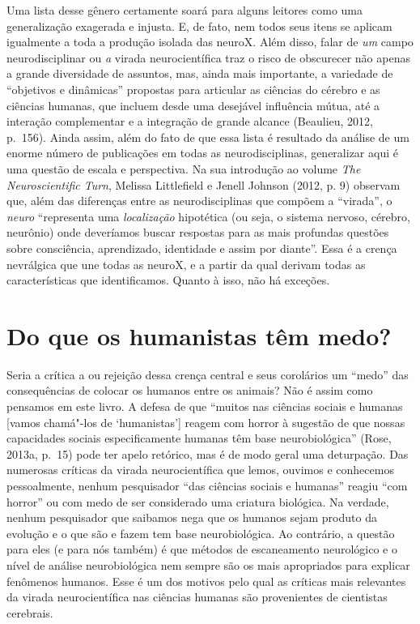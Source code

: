Uma lista desse gênero certamente soará para alguns leitores como uma
generalização exagerada e injusta. E, de fato, nem todos seus itens se
aplicam igualmente a toda a produção isolada das neuroX. Além disso,
falar de \emph{um} campo neurodisciplinar ou \emph{a} virada
neurocientífica traz o risco de obscurecer não apenas a grande
diversidade de assuntos, mas, ainda mais importante, a variedade de
``objetivos e dinâmicas'' propostas para articular as ciências do
cérebro e as ciências humanas, que incluem desde uma desejável
influência mútua, até a interação complementar e a integração de grande
alcance (Beaulieu, 2012, p.~156). Ainda assim, além do fato de que essa
lista é resultado da análise de um enorme número de publicações em todas
as neurodisciplinas, generalizar aqui é uma questão de escala e
perspectiva. Na sua introdução ao volume \emph{The Neuroscientific
Turn}, Melissa Littlefield e Jenell Johnson (2012, p. 9) observam que,
além das diferenças entre as neurodisciplinas que compõem a ``virada'',
o \emph{neuro} ``representa uma \emph{localização} hipotética (ou seja,
o sistema nervoso, cérebro, neurônio) onde deveríamos buscar respostas
para as mais profundas questões sobre consciência, aprendizado,
identidade e assim por diante''. Essa é a crença nevrálgica que une
todas as neuroX, e a partir da qual derivam todas as características que
identificamos. Quanto à isso, não há exceções.

\chapter{Do que os humanistas têm medo?}

Seria a crítica a ou rejeição dessa crença central e seus corolários um
``medo'' das consequências de colocar os humanos entre os animais? Não é
assim como pensamos em este livro. A defesa de que ``muitos nas ciências
sociais e humanas {[}vamos chamá"-los de `humanistas'{]} reagem com
horror à sugestão de que nossas capacidades sociais especificamente
humanas têm base neurobiológica'' (Rose, 2013a, p.~15) pode ter apelo
retórico, mas é de modo geral uma deturpação. Das numerosas críticas da
virada neurocientífica que lemos, ouvimos e conhecemos pessoalmente,
nenhum pesquisador ``das ciências sociais e humanas'' reagiu ``com
horror'' ou com medo de ser considerado uma criatura biológica. Na
verdade, nenhum pesquisador que saibamos nega que os humanos sejam
produto da evolução e o que são e fazem tem base neurobiológica. Ao
contrário, a questão para eles (e para nós também) é que métodos de
escaneamento neurológico e o nível de análise neurobiológica nem sempre
são os mais apropriados para explicar fenômenos humanos. Esse é um dos
motivos pelo qual as críticas mais relevantes da virada neurocientífica
nas ciências humanas são provenientes de cientistas cerebrais.

